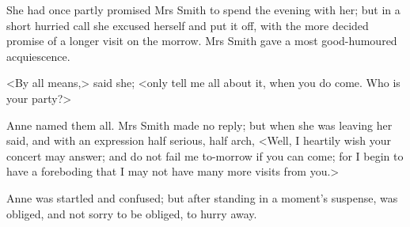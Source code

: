 She had once partly promised Mrs Smith to spend the evening with her; but in a short hurried call she excused herself and put it off, with the more decided promise of a longer visit on the morrow. Mrs Smith gave a most good-humoured acquiescence.

<By all means,> said she; <only tell me all about it, when you do come. Who is your party?>

Anne named them all. Mrs Smith made no reply; but when she was leaving her said, and with an expression half serious, half arch, <Well, I heartily wish your concert may answer; and do not fail me to-morrow if you can come; for I begin to have a foreboding that I may not have many more visits from you.>

Anne was startled and confused; but after standing in a moment's suspense, was obliged, and not sorry to be obliged, to hurry away.